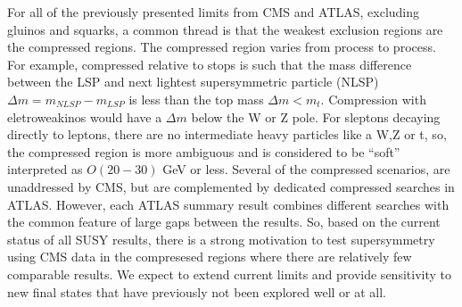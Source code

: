 

For all of the previously presented limits from CMS and ATLAS, excluding gluinos and squarks, a common thread is that the weakest exclusion regions are the compressed regions. The compressed region varies from process to process. For example, compressed relative to stops is such that the mass difference between the LSP and next lightest supersymmetric particle (NLSP) $\Delta m = m_{NLSP} - m_{LSP}$ is less than the top mass $\Delta m < m_t$. Compression with eletroweakinos would have a $\Delta m$  below the W or Z pole. For sleptons decaying directly to leptons, there are no intermediate heavy particles like a W,Z or t, so, the compressed region is more ambiguous and is considered to be ``soft'' interpreted as $O(20-30)$ GeV or less. Several of the compressed scenarios, are unaddressed by CMS, but are complemented by dedicated compressed searches in ATLAS. However, each ATLAS summary result combines different searches with the common feature of large gaps between the results. So, based on the current status of all SUSY results, there is a strong motivation to test supersymmetry using CMS data in the compresesed regions where there are relatively few comparable results. We expect to extend current limits and provide sensitivity to new final states that have previously not been explored well or at all.

